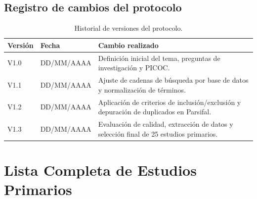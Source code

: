 \documentclass[12pt, a4paper]{article}
\begin{document}
\subsection*{Registro de cambios del protocolo}

\begin{table}[H]
\centering
\caption{Historial de versiones del protocolo.}
\label{tab:historial_protocolo}
\begin{tabularx}{\linewidth}{p{2cm}p{3cm}X}
\toprule
\textbf{Versi\'{o}n} & \textbf{Fecha} & \textbf{Cambio realizado} \\
\midrule
V1.0 & DD/MM/AAAA & Definici\'{o}n inicial del tema, preguntas de investigaci\'{o}n y PICOC. \\
V1.1 & DD/MM/AAAA & Ajuste de cadenas de b\'{u}squeda por base de datos y normalizaci\'{o}n de t\'{e}rminos. \\
V1.2 & DD/MM/AAAA & Aplicaci\'{o}n de criterios de inclusi\'{o}n/exclusi\'{o}n y depuraci\'{o}n de duplicados en Parsifal. \\
V1.3 & DD/MM/AAAA & Evaluaci\'{o}n de calidad, extracci\'{o}n de datos y selecci\'{o}n final de 25 estudios primarios. \\
\bottomrule
\end{tabularx}
\end{table}

\section{Lista Completa de Estudios Primarios}
\end{document}

